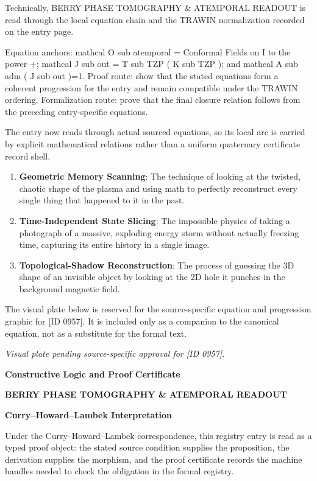 Technically, BERRY PHASE TOMOGRAPHY \& ATEMPORAL READOUT is read through the local equation chain and the TRAWIN normalization recorded on the entry page.

Equation anchors: mathcal O sub atemporal = Conformal Fields on I to the power +; mathcal J sub out = T sub TZP ( K sub TZP ); and mathcal A sub adm ( J sub out )=1. Proof route: show that the stated equations form a coherent progression for the entry and remain compatible under the TRAWIN ordering. Formalization route: prove that the final closure relation follows from the preceding entry-specific equations.

The entry now reads through actual sourced equations, so its local arc is carried by explicit mathematical relations rather than a uniform quaternary certificate record shell.
\endgroup

\begin{enumerate}[leftmargin=1.6em,itemsep=6pt,topsep=4pt]
\item \textbf{Geometric Memory Scanning}: The technique of looking at the twisted, chaotic shape of the plasma and using math to perfectly reconstruct every single thing that happened to it in the past.
\item \textbf{Time-Independent State Slicing}: The impossible physics of taking a photograph of a massive, exploding energy storm without actually freezing time, capturing its entire history in a single image.
\item \textbf{Topological-Shadow Reconstruction}: The process of guessing the 3D shape of an invisible object by looking at the 2D hole it punches in the background magnetic field.
\end{enumerate}

\begingroup\footnotesize\sloppy
The visual plate below is reserved for the source-specific equation and progression graphic for [ID 0957]. It is included only as a companion to the canonical equation, not as a substitute for the formal text.
\par\endgroup
\begingroup\footnotesize\itshape
Visual plate pending source-specific approval for [ID 0957].
\par\endgroup

\clearpage
\begingroup\tzpsupportsetup
\noindent\textbf{\fontsize{10.8pt}{12.8pt}\selectfont [ID 0957] Constructive Logic and Proof Certificate}\par
\noindent\textbf{\fontsize{10pt}{12pt}\selectfont BERRY PHASE TOMOGRAPHY \& ATEMPORAL READOUT}\par
\vspace{0.45em}
\begingroup
\footnotesize
\setlength{\parskip}{0.22em}
\setlength{\parindent}{0pt}
\noindent\textbf{Curry--Howard--Lambek Interpretation}\par
Under the Curry--Howard--Lambek correspondence, this registry entry is read as a typed proof
object: the stated source condition supplies the proposition, the derivation supplies the
morphism, and the proof certificate records the machine handles needed to check the obligation
in the formal registry.

